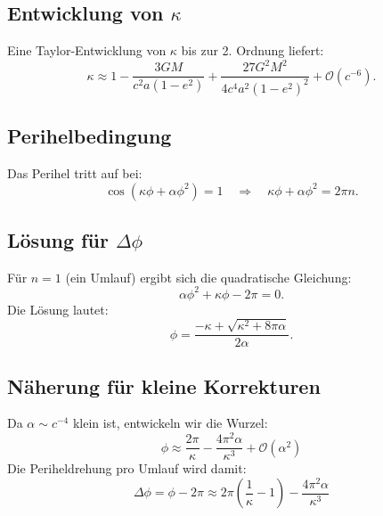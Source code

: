 \subsection*{Entwicklung von $\kappa$}
Eine Taylor-Entwicklung von $\kappa$ bis zur 2. Ordnung liefert:
\[
    \kappa \approx 1 - \frac{3GM}{c^2 a(1 - e^2)} + \frac{27G^2 M^2}{4c^4 a^2 (1 - e^2)^2} + \mathcal{O}(c^{-6}).
\]

\subsection*{Perihelbedingung}
Das Perihel tritt auf bei:
\[
    \cos\left(\kappa\phi + \alpha\phi^2\right) = 1 \quad \Rightarrow \quad \kappa\phi + \alpha\phi^2 = 2\pi n.
\]

\subsection*{Lösung für $\Delta\phi$}
Für $n=1$ (ein Umlauf) ergibt sich die quadratische Gleichung:
\[
\alpha\phi^2 + \kappa\phi - 2\pi = 0.
\]
Die Lösung lautet:
\begin{equation}
\phi = \frac{-\kappa + \sqrt{\kappa^2 + 8\pi\alpha}}{2\alpha}.
\end{equation}

\subsection*{Näherung für kleine Korrekturen}
Da $\alpha \sim c^{-4}$ klein ist, entwickeln wir die Wurzel:
\[
    \phi \approx \frac{2\pi}{\kappa} - \frac{4\pi^2\alpha}{\kappa^3} + \mathcal{O}(\alpha^2)
\]
Die Periheldrehung pro Umlauf wird damit:
\begin{equation}
    \boxed
    {
        \Delta\phi = \phi - 2\pi \approx 2\pi\left(\frac{1}{\kappa} - 1\right) - \frac{4\pi^2\alpha}{\kappa^3}
    }
\end{equation}
